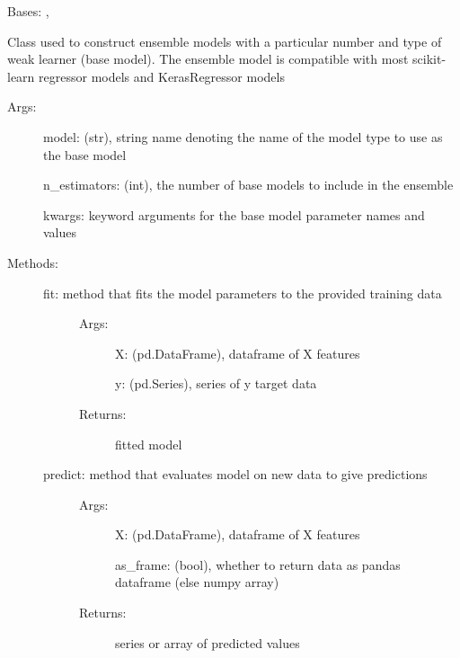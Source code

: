 \documentclass[letterpaper,10pt,english]{sphinxmanual}
\begin{document}
\begin{fulllineitems}
\label{\detokenize{api/mastml.models.EnsembleModel:mastml.models.EnsembleModel}}
Bases: , 

Class used to construct ensemble models with a particular number and type of weak learner (base model). The
ensemble model is compatible with most scikit-learn regressor models and KerasRegressor models
\begin{description}
\item[{Args:}] \leavevmode
model: (str), string name denoting the name of the model type to use as the base model

n\_estimators: (int), the number of base models to include in the ensemble

kwargs: keyword arguments for the base model parameter names and values

\item[{Methods:}] \leavevmode\begin{description}
\item[{fit: method that fits the model parameters to the provided training data}] \leavevmode\begin{description}
\item[{Args:}] \leavevmode
X: (pd.DataFrame), dataframe of X features

y: (pd.Series), series of y target data

\item[{Returns:}] \leavevmode
fitted model

\end{description}

\item[{predict: method that evaluates model on new data to give predictions}] \leavevmode\begin{description}
\item[{Args:}] \leavevmode
X: (pd.DataFrame), dataframe of X features

as\_frame: (bool), whether to return data as pandas dataframe (else numpy array)

\item[{Returns:}] \leavevmode
series or array of predicted values

\end{description}


\end{description}
\end{description}
\end{fulllineitems}
\end{document}

